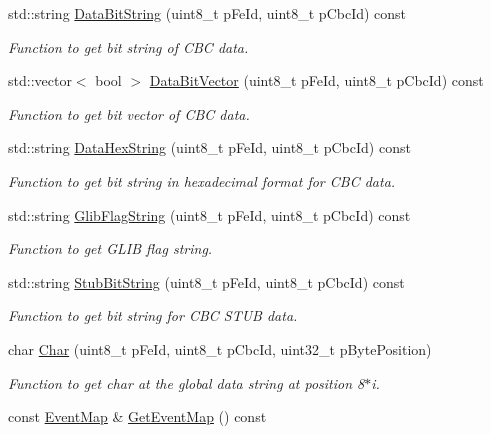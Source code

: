 \begin{CompactItemize}
std::string \hyperlink{class_ph2___hw_interface_1_1_event_db005c7fbcd56f6cb66a4b83b185886b}{Data\-Bit\-String} (uint8\_\-t p\-Fe\-Id, uint8\_\-t p\-Cbc\-Id) const 
\begin{CompactList}\small\item\em Function to get bit string of CBC data. \item\end{CompactList}\item 
std::vector$<$ bool $>$ \hyperlink{class_ph2___hw_interface_1_1_event_54db44c9de8f4ca816d8cadcaa733260}{Data\-Bit\-Vector} (uint8\_\-t p\-Fe\-Id, uint8\_\-t p\-Cbc\-Id) const 
\begin{CompactList}\small\item\em Function to get bit vector of CBC data. \item\end{CompactList}\item 
std::string \hyperlink{class_ph2___hw_interface_1_1_event_b7a41db929dba07f724a0b0f3e5ba626}{Data\-Hex\-String} (uint8\_\-t p\-Fe\-Id, uint8\_\-t p\-Cbc\-Id) const 
\begin{CompactList}\small\item\em Function to get bit string in hexadecimal format for CBC data. \item\end{CompactList}\item 
std::string \hyperlink{class_ph2___hw_interface_1_1_event_8b6a50a409927366a830084f11885882}{Glib\-Flag\-String} (uint8\_\-t p\-Fe\-Id, uint8\_\-t p\-Cbc\-Id) const 
\begin{CompactList}\small\item\em Function to get GLIB flag string. \item\end{CompactList}\item 
std::string \hyperlink{class_ph2___hw_interface_1_1_event_bc647a9563bd796f8785590a2b5b525b}{Stub\-Bit\-String} (uint8\_\-t p\-Fe\-Id, uint8\_\-t p\-Cbc\-Id) const 
\begin{CompactList}\small\item\em Function to get bit string for CBC STUB data. \item\end{CompactList}\item 
char \hyperlink{class_ph2___hw_interface_1_1_event_348abea85bdfdfc8c0b88cda907dbea8}{Char} (uint8\_\-t p\-Fe\-Id, uint8\_\-t p\-Cbc\-Id, uint32\_\-t p\-Byte\-Position)
\begin{CompactList}\small\item\em Function to get char at the global data string at position 8$\ast$i. \item\end{CompactList}\item 
const \hyperlink{namespace_ph2___hw_interface_cf9f41d647e7a3ad9bae233b04b9e3bc}{Event\-Map} \& \hyperlink{class_ph2___hw_interface_1_1_event_64814e9ba1b9cd7ed1e8dd5587275f49}{Get\-Event\-Map} () const 
\end{CompactItemize}
